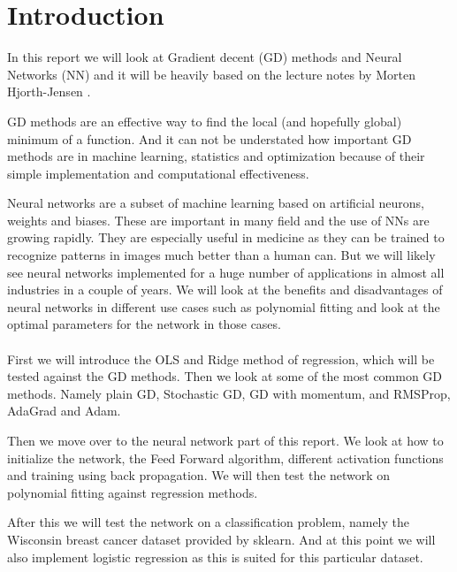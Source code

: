 \section{Introduction}


\begin{comment}
    In this report we will look at ...
    Motivate the reader, the first part of the introduction gives always a
    motivation and tries to give the overarching ideas. What I have done. 
    The structure of the report, how it is organised. Explain structure of the rapport at the end of intro. 
\end{comment}

In this report we will look at Gradient decent (GD) methods and Neural Networks
(NN) and it will be heavily based on the lecture notes by Morten Hjorth-Jensen
\cite{w41}.

GD methods are an effective way to find the local (and hopefully global)
minimum of a function. And it can not be understated how important GD methods
are in machine learning, statistics and optimization because of their simple
implementation and computational effectiveness.

Neural networks are a subset of machine learning based on artificial neurons,
weights and biases. These are important in many field and the use of NNs
are growing rapidly. They are especially useful in medicine as they can be
trained to recognize patterns in images much better than a human can. But we
will likely see neural networks implemented for a huge number of applications
in almost all industries in a couple of years. We will look at the benefits and
disadvantages of neural networks in different use cases such as polynomial
fitting and look at the optimal parameters for the network in those cases.
\\~\\
First we will introduce the OLS and Ridge method of regression, which will be
tested against the GD methods. Then we look at some of the most common GD methods. Namely plain
GD, Stochastic GD, GD with momentum, and RMSProp, AdaGrad and Adam. 

Then we move over to the neural network part of this report. We look at how to
initialize the network, the Feed Forward algorithm, different activation functions and
training using back propagation. We will then test the network on polynomial
fitting against regression methods.

After this we will test the network on a classification problem, namely
the Wisconsin breast cancer dataset provided by sklearn. And at this point we
will also implement logistic regression as this is suited for this particular
dataset. 
